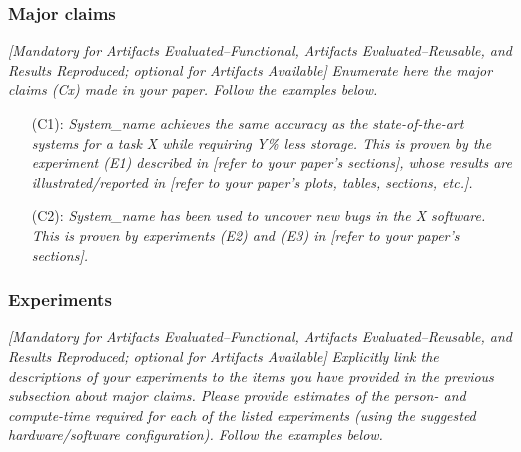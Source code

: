 \documentclass[sigconf]{acmart}
\begin{document}
	
	\subsubsection{Major claims}
	
	\emph{[Mandatory for \emph{Artifacts Evaluated--Functional},
		\emph{Artifacts Evaluated--Reusable}, and \emph{Results Reproduced};
		optional for \emph{Artifacts Available}]}
	\emph{Enumerate here the major claims (Cx) made in your paper.  Follow
		the examples below.}
	\bigskip
	
	\begin{itemize}
		\item[(C1):]
		\emph{System\_name achieves the same accuracy as the
			state-of-the-art systems for a task X while requiring Y\% less
			storage.  This is proven by the experiment (E1) described in [refer
			to your paper's sections], whose results are illustrated/reported
			in [refer to your paper's plots, tables, sections, etc.].}
		
		\item[(C2):]
		\emph{System\_name has been used to uncover new bugs in the X
			software.  This is proven by experiments (E2) and (E3) in [refer to
			your paper's sections].}
	\end{itemize}
	
	
	\subsubsection{Experiments}
	
	\emph{[Mandatory for \emph{Artifacts Evaluated--Functional},
		\emph{Artifacts Evaluated--Reusable}, and \emph{Results Reproduced};
		optional for \emph{Artifacts Available}]}
	\emph{Explicitly link the descriptions of your experiments to the
		items you have provided in the previous subsection about major claims.
		Please provide estimates of the person- and compute-time required for
		each of the listed experiments (using the suggested hardware/software
		configuration).  Follow the examples below.}
	
\end{document}
